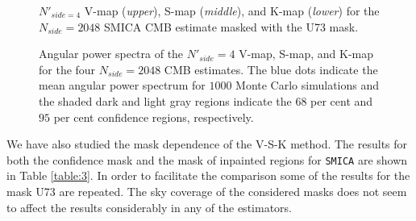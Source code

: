 \begin{figure}
\centering
\caption{$N'_{side = 4}$ V-map (\textit{upper}), S-map (\textit{middle}), and K-map (\textit{lower}) for the $N_{side} = 2048$ SMICA CMB estimate masked with the U73 mask.}
\label{Fig:3}
\end{figure}

\begin{figure}
\centering
\caption{Angular power spectra of the $N'_{side} = 4$ V-map, S-map, and K-map for the four $N_{side} = 2048$ CMB estimates. The blue dots indicate the mean angular power spectrum for $1000$ Monte Carlo simulations and the shaded dark and light gray regions indicate the $68$ per cent and $95$ per cent confidence regions, respectively.}
\label{Fig:4}
\end{figure}

We have also studied the mask dependence of the V-S-K method. The results for both the confidence mask and the mask of inpainted regions for \texttt{SMICA} are shown in Table \ref{table:3}. In order to facilitate the comparison some of the results for the mask U73 are repeated. The sky coverage of the considered masks does not seem to affect the results considerably in any of the estimators. 

